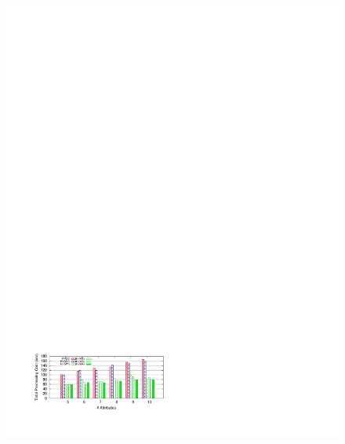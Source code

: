 \begin{figure}[ht]
\begin{center}
{            \includegraphics[trim=1.8cm 2.2cm 11cm 22cm]{Figures/holistic/skew_ma}
        }\vspace{-0.1 in}%
\end{center}
\end{figure}
